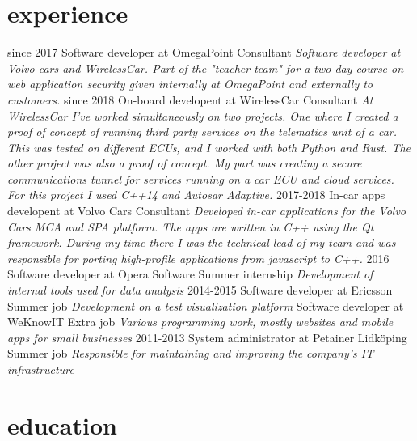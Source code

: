 \documentclass[]{friggeri-cv}
\begin{document}
\section{experience}
\begin{entrylist}
	\entry
	{since 2017}
	{Software developer at OmegaPoint}
	{Consultant}
	{\emph{Software developer at Volvo cars and WirelessCar. Part of the "teacher team" for a two-day course on web application security given internally at OmegaPoint and externally to customers.}}
	\entry
	{since 2018}
	{On-board developent at WirelessCar}
	{Consultant}
	{\emph{At WirelessCar I've worked simultaneously on two projects. One where I created a proof of concept of running third party services on the telematics unit of a car. This was tested on different ECUs, and I worked with both Python and Rust. The other project was also a proof of concept. My part was creating a secure communications tunnel for services running on a car ECU and cloud services. For this project I used C++14 and Autosar Adaptive.}}
	\entry
	{2017-2018}
	{In-car apps developent at Volvo Cars}
	{Consultant}
	{\emph{Developed in-car applications for the Volvo Cars MCA and SPA platform. The apps are written in C++ using the Qt framework. During my time there I was the technical lead of my team and was responsible for porting high-profile applications from javascript to C++.}}
  \entry
  {2016}
  {Software developer at Opera Software}
  {Summer internship}
  {\emph{Development of internal tools used for data analysis}}
  \entry
  {2014-2015}
  {Software developer at Ericsson}
  {Summer job}
  {\emph{Development on a test visualization platform}}
  {Software developer at WeKnowIT}
  {Extra job}
  {\emph{Various programming work, mostly websites and mobile apps for small
  businesses}}
  \entry
  {2011-2013}
  {System administrator at Petainer Lidköping}
  {Summer job}
  {\emph{Responsible for maintaining and improving the company's IT infrastructure}}
\end{entrylist}

\section{education}
\end{document}
